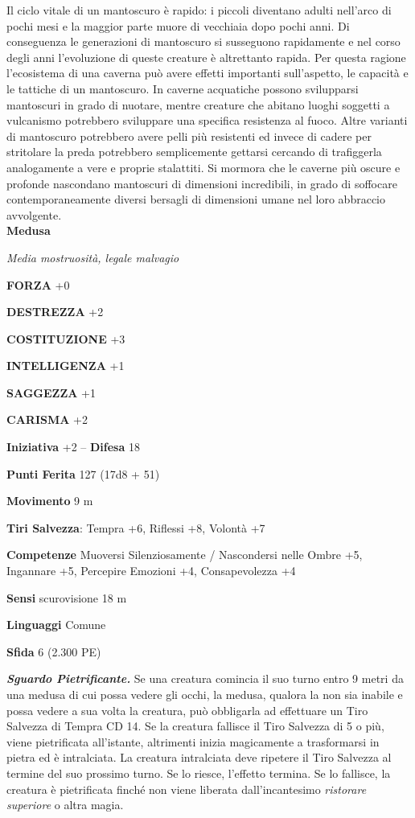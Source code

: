 \begin{multicols}{2}
Il ciclo vitale di un mantoscuro è rapido: i piccoli diventano adulti nell'arco di pochi mesi e la maggior parte muore di vecchiaia dopo pochi anni. Di conseguenza le generazioni di mantoscuro si susseguono rapidamente e nel corso degli anni l'evoluzione di queste creature è altrettanto rapida. Per questa ragione l'ecosistema di una caverna può avere effetti importanti sull'aspetto, le capacità e le tattiche di un mantoscuro. In caverne acquatiche possono svilupparsi mantoscuri in grado di nuotare, mentre creature che abitano luoghi soggetti a vulcanismo potrebbero sviluppare una specifica resistenza al fuoco. Altre varianti di mantoscuro potrebbero avere pelli più resistenti ed invece di cadere per stritolare la preda potrebbero semplicemente gettarsi cercando di trafiggerla analogamente a vere e proprie stalattiti. Si mormora che le caverne più oscure e profonde nascondano mantoscuri di dimensioni incredibili, in grado di soffocare contemporaneamente diversi bersagli di dimensioni umane nel loro abbraccio avvolgente.\\


\medskip{}\textbf{Medusa}

\emph{Media mostruosità, legale malvagio}

\textbf{FORZA} +0

\textbf{DESTREZZA} +2

\textbf{COSTITUZIONE} +3

\textbf{INTELLIGENZA} +1

\textbf{SAGGEZZA} +1

\textbf{CARISMA} +2

\textbf{Iniziativa} +2 -- \textbf{Difesa} 18

\textbf{Punti Ferita} 127 (17d8 + 51)

\textbf{Movimento} 9 m

\textbf{Tiri Salvezza}: Tempra +6, Riflessi +8, Volontà +7

\textbf{Competenze} Muoversi Silenziosamente / Nascondersi nelle Ombre +5, Ingannare +5, Percepire Emozioni +4, Consapevolezza +4

\textbf{Sensi} scurovisione 18 m

\textbf{Linguaggi} Comune

\textbf{Sfida} 6 (2.300 PE)

\emph{\textbf{Sguardo Pietrificante.}} Se una creatura comincia il suo turno entro 9 metri da una medusa di cui possa vedere gli occhi, la medusa, qualora la non sia inabile e possa vedere a sua volta la creatura, può obbligarla ad effettuare un Tiro Salvezza di Tempra CD 14. Se la creatura fallisce il Tiro Salvezza di 5 o più, viene pietrificata all'istante, altrimenti inizia magicamente a trasformarsi in pietra ed è intralciata. La creatura intralciata deve ripetere il Tiro Salvezza al termine del suo prossimo turno. Se lo riesce, l'effetto termina. Se lo fallisce, la creatura è pietrificata finché non viene liberata dall'incantesimo \emph{ristorare superiore} o altra magia.


\end{multicols}
